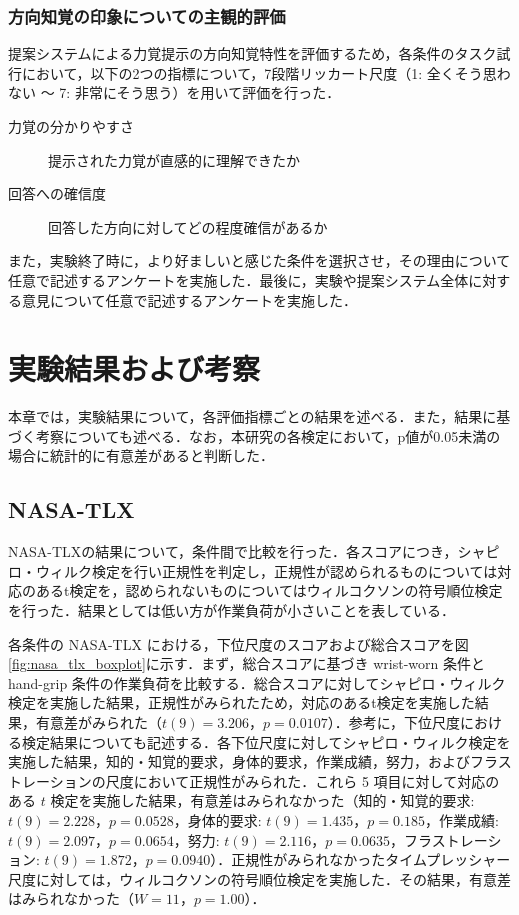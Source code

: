 \documentclass[a4paper,11pt]{jreport}
\begin{document}
\subsection{方向知覚の印象についての主観的評価}
提案システムによる力覚提示の方向知覚特性を評価するため，各条件のタスク試行において，以下の2つの指標について，7段階リッカート尺度（1: 全くそう思わない ～ 7: 非常にそう思う）を用いて評価を行った．

\begin{description}
    \item[力覚の分かりやすさ] 提示された力覚が直感的に理解できたか
    \item[回答への確信度] 回答した方向に対してどの程度確信があるか
\end{description}

また，実験終了時に，より好ましいと感じた条件を選択させ，その理由について任意で記述するアンケートを実施した．最後に，実験や提案システム全体に対する意見について任意で記述するアンケートを実施した．

\chapter{実験結果および考察}
本章では，実験結果について，各評価指標ごとの結果を述べる．また，結果に基づく考察についても述べる．なお，本研究の各検定において，p値が0.05未満の場合に統計的に有意差があると判断した．

\section{NASA-TLX}
\label{sec:nasa-tlx}
NASA-TLXの結果について，条件間で比較を行った．各スコアにつき，シャピロ・ウィルク検定を行い正規性を判定し，正規性が認められるものについては対応のあるt検定を，認められないものについてはウィルコクソンの符号順位検定を行った．結果としては低い方が作業負荷が小さいことを表している．

各条件の NASA-TLX における，下位尺度のスコアおよび総合スコアを図\ref{fig:nasa_tlx_boxplot}に示す．まず，総合スコアに基づき wrist-worn 条件と hand-grip 条件の作業負荷を比較する．総合スコアに対してシャピロ・ウィルク検定を実施した結果，正規性がみられたため，対応のあるt検定を実施した結果，有意差がみられた（$t(9) = 3.206$，$p = 0.0107$）．参考に，下位尺度における検定結果についても記述する．各下位尺度に対してシャピロ・ウィルク検定を実施した結果，知的・知覚的要求，身体的要求，作業成績，努力，およびフラストレーションの尺度において正規性がみられた．これら 5 項目に対して対応のある $t$ 検定を実施した結果，有意差はみられなかった（知的・知覚的要求: $t(9) = 2.228$，$p = 0.0528$，身体的要求: $t(9) = 1.435$，$p = 0.185$，作業成績: $t(9) = 2.097$，$p = 0.0654$，努力: $t(9) = 2.116$，$p = 0.0635$，フラストレーション: $t(9) = 1.872$，$p = 0.0940$）．正規性がみられなかったタイムプレッシャー尺度に対しては，ウィルコクソンの符号順位検定を実施した．その結果，有意差はみられなかった（$W = 11$，$p = 1.00$）．
\end{document}
